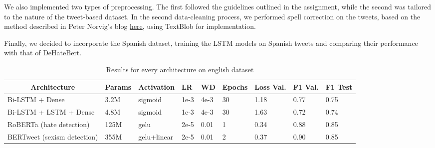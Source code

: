 \documentclass[11pt]{article}
\begin{document}
We also implemented two types of preprocessing. The first followed the guidelines outlined in the assignment, while the second was tailored to the nature of the tweet-based dataset. In the second data-cleaning process, we performed spell correction on the tweets, based on the method described in Peter Norvig's blog \href{https://norvig.com/spell-correct.html}{here}, using TextBlob for implementation.

Finally, we decided to incorporate the Spanish dataset, training the LSTM models on Spanish tweets and comparing their performance with that of DeHateBert.





\begin{table*}[!t]
\begin{tabular}{l|l|l|l|l|l|l|l|l}
\multicolumn{1}{c|}{\textbf{Architecture}} & \textbf{Params} & \textbf{Activation} & \textbf{LR} & \textbf{WD} & \textbf{Epochs} & \textbf{Loss Val.} & \textbf{F1 Val.} & \multicolumn{1}{c}{\textbf{F1 Test}} \\ \hline

Bi-LSTM + Dense		& 	3.2M	& sigmoid		& 1e-3	& 4e-3 	& 30 &  1.18  &	0.77 & 0.75 \\
Bi-LSTM + LSTM + Dense	& 		4.8M	& sigmoid		& 1e-3	& 4e-3	& 30 &	1.63 & 0.72 & 0.74\\
RoBERTa (hate detection)	&  125M	& gelu	& 2e-5	& 0.01		& 1	& 0.34 	& 0.88 & 0.85\\
BERTweet (sexism detection)	&  355M	& gelu+linear	& 2e-5	& 0.01	& 2	& 0.37  & 0.90 & 0.85\\

\end{tabular}
\caption{Results for every architecture on english dataset}
\end{table*}
\end{document}
